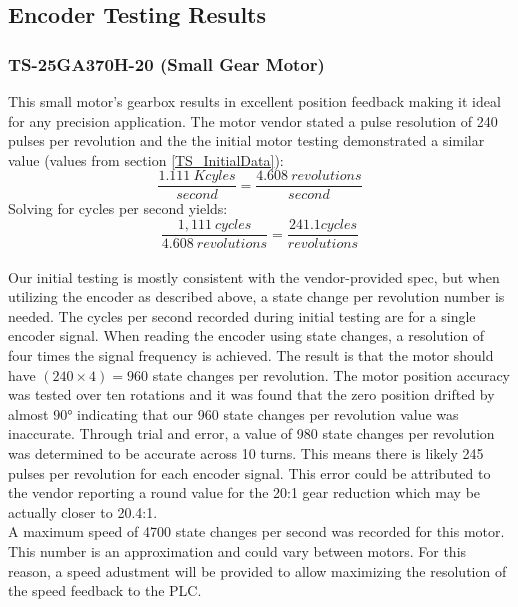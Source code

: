 \documentclass[main.tex]{subfiles}
\begin{document}
\subsection{Encoder Testing Results}

\subsubsection{TS-25GA370H-20 (Small Gear Motor)}

This small motor’s gearbox results in excellent position feedback making it ideal for any precision application. The motor vendor stated a pulse resolution of 240 pulses per revolution and the the initial motor testing demonstrated a similar value (values from section \ref{TS_InitialData}):
$$\frac{1.111\ Kcyles}{second}=\frac{4.608\ revolutions}{second}$$
Solving for cycles per second yields: 
$$\frac{1,111\ cycles}{4.608\ revolutions}=\frac{241.1cycles}{revolutions}$$\\

\noindent Our initial testing is mostly consistent with the vendor-provided spec, but when utilizing the encoder as described above, a state change per revolution number is needed. The cycles per second recorded during initial testing are for a single encoder signal. When reading the encoder using state changes, a resolution of four times the signal frequency is achieved. The result is that the motor should have $(240\times4)=960$ state changes per revolution. The motor position accuracy was tested over ten rotations and it was found that the zero position drifted by almost 90° indicating that our 960 state changes per revolution value was inaccurate. Through trial and error, a value of 980 state changes per revolution was determined to be accurate across 10 turns. This means there is likely 245 pulses per revolution for each encoder signal. This error could be attributed to the vendor reporting a round value for the 20:1 gear reduction which may be actually closer to 20.4:1.\\

\noindent A maximum speed of 4700 state changes per second was recorded for this motor. This number is an approximation and could vary between motors. For this reason, a speed adustment will be provided to allow maximizing the resolution of the speed feedback to the PLC.
\end{document}
